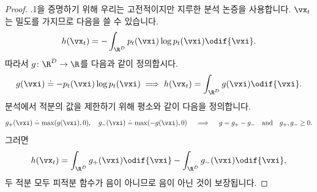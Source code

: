 \documentclass[../../book-main_ko.tex]{subfiles}
\begin{document}
\begin{proof}
    .1을 증명하기 위해 우리는 고전적이지만 지루한 분석 논증을 사용합니다. \(\vx_{t}\)는 밀도를 가지므로 다음을 쓸 수 있습니다.
    \begin{equation}
        h(\vx_{t}) = -\int_{\R^{D}}p_{t}(\vxi)\log p_{t}(\vxi) \odif{\vxi}.
    \end{equation}
    따라서 \(g \colon \R^{D} \to \R\)를 다음과 같이 정의합시다.
    \begin{equation}
        g(\vxi) \doteq -p_{t}(\vxi)\log p_{t}(\vxi) \implies h(\vx_{t}) = \int_{\R^{D}}g(\vxi)\odif{\vxi}.
    \end{equation}
    분석에서 적분의 값을 제한하기 위해 평소와 같이 다음을 정의합니다.
    \begin{equation}
        g_{+}(\vxi) \doteq \max(g(\vxi), 0), \quad g_{-}(\vxi) \doteq \max(-g(\vxi), 0) \quad \implies \quad g = g_{+} - g_{-} \quad \text{and} \quad g_{+}, g_{-} \geq 0.
    \end{equation}
    그러면
    \begin{equation}
        h(\vx_{t}) = \int_{\R^{D}}g_{+}(\vxi)\odif{\vxi} - \int_{\R^{D}}g_{-}(\vxi)\odif{\vxi},
    \end{equation}
    두 적분 모두 피적분 함수가 음이 아니므로 음이 아닌 것이 보장됩니다. 
    

\end{proof}
\end{document}
